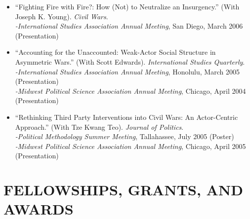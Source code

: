\documentclass[10pt]{article}
\begin{document}
\begin{itemize}
\item ``Fighting Fire with Fire?: How (Not) to Neutralize an Insurgency.'' (With Joseph K. Young). \textit{Civil Wars}. 
	\\ \indent \textit{-International Studies Association Annual Meeting}, San Diego, March 2006 (Presentation)

\item ``Accounting for the Unaccounted: Weak-Actor Social Structure in Asymmetric Wars.'' (With Scott Edwards). \textit{International Studies Quarterly}. 
	\\ \indent \textit{-International Studies Association Annual Meeting}, Honolulu, March 2005 (Presentation)
	\\ \indent \textit{-Midwest Political Science Association Annual Meeting}, Chicago, April 2004 (Presentation)

\item ``Rethinking Third Party Interventions into Civil Wars: An Actor-Centric Approach.'' (With Tze Kwang Teo). \textit{Journal of Politics}. 
	\\ \indent \textit{-Political Methodology Summer Meeting}, Tallahassee, July 2005 (Poster)
	\\ \indent \textit{-Midwest Political Science Association Annual Meeting}, Chicago, April 2005 (Presentation)
\end{itemize}





\section*{FELLOWSHIPS, GRANTS, AND AWARDS}
\end{document}
